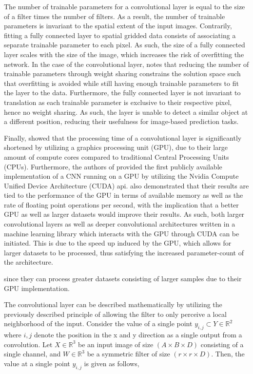 \documentclass[../main/thesis.tex]{subfiles}
\begin{document}
The number of trainable parameters for a convolutional layer is equal to the size of a filter times the number of filters. As a result, the number of trainable parameters is invariant to the spatial extent of the input images. Contrarily, fitting a fully connected layer to spatial gridded data consists of associating a separate trainable parameter to each pixel. As such, the size of a fully connected layer scales with the size of the image, which increases the risk of overfitting the network. In the case of the convolutional layer, \citet{LeCun1989} notes that reducing the number of trainable parameters through weight sharing constrains the solution space such that overfitting is avoided while still having enough trainable parameters to fit the layer to the data. Furthermore, the fully connected layer is not invariant to translation as each trainable parameter is exclusive to their respective pixel, hence no weight sharing. As such, the layer is unable to detect a similar object at a different position, reducing their usefulness for image-based prediction tasks.

Finally, \citet{Ciresan2012} showed that the processing time of a convolutional layer is significantly shortened by utilizing a graphics processing unit (GPU), due to their large amount of compute cores compared to traditional Central Processing Units (CPUs). Furthermore, the authors of \citet{Krizhevsky2012} provided the first publicly available implementation of a CNN running on a GPU by utilizing the Nvidia Compute Unified Device Architecture (CUDA) api. \citet{Krizhevsky2012} also demonstrated that their results are tied to the performance of the GPU in terms of available memory as well as the rate of floating point operations per second, with the implication that a better GPU as well as larger datasets would improve their results. As such, both larger convolutional layers as well as deeper convolutional architectures written in a machine learning library which interacts with the GPU through CUDA \citep{Jia2014,tensorflow2015-whitepaper,Paszke2019} can be initiated. This is due to the speed up induced by the GPU, which allows for larger datasets to be processed, thus satisfying the increased parameter-count of the architecture.

since they can process greater datasets consisting of larger samples due to their GPU implementation.

The convolutional layer can be described mathematically by utilizing the previously described principle of allowing the filter to only perceive a local neighborhood of the input. Consider the value of a single point $y_{i,j} \subset Y \in{\mathbb{R}^2}$ where $i,j$ denote the position in the x and y direction as a single output from a convolution. Let $X \in{\mathbb{R}^3}$ be an input image of size $(A \times B \times D)$ consisting of a single channel, and $W \in{\mathbb{R}^3}$ be a symmetric filter of size $(r \times r \times D)$. Then, the value at a single point $y_{i,j}$ is given as follows,
\end{document}
